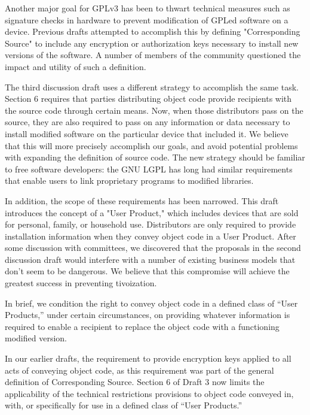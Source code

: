 


Another major goal for GPLv3 has been to thwart technical measures such as
signature checks in hardware to prevent modification of GPLed software on a
device.  Previous drafts attempted to accomplish this by defining
"Corresponding Source" to include any encryption or authorization keys
necessary to install new versions of the software.  A number of members of
the community questioned the impact and utility of such a definition.

The third discussion draft uses a different strategy to accomplish the same
task.  Section 6 requires that parties distributing object code provide
recipients with the source code through certain means.  Now, when those
distributors pass on the source, they are also required to pass on any
information or data necessary to install modified software on the
particular device that included it.  We believe that this will more
precisely accomplish our goals, and avoid potential problems with expanding
the definition of source code.  The new strategy should be familiar to free
software developers: the GNU LGPL has long had similar requirements that
enable users to link proprietary programs to modified libraries.

\label{user-product}
In addition, the scope of these requirements has been narrowed.  This draft
introduces the concept of a "User Product," which includes devices that are
sold for personal, family, or household use.  Distributors are only
required to provide installation information when they convey object code
in a User Product.  After some discussion with committees, we discovered
that the proposals in the second discussion draft would interfere with a
number of existing business models that don't seem to be dangerous.  We
believe that this compromise will achieve the greatest success in
preventing tivoization.

In brief, we condition the right to convey object code in a defined class of
``User Products,'' under certain circumstances, on providing whatever
information is required to enable a recipient to replace the object code with
a functioning modified version.


In our earlier drafts, the requirement to provide encryption keys
applied to all acts of conveying object code, as this requirement was
part of the general definition of Corresponding Source. Section 6 of
Draft 3 now limits the applicability of the technical restrictions
provisions to object code conveyed in, with, or specifically for use in
a defined class of ``User Products.''

